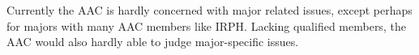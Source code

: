 Currently the AAC is hardly concerned with major related issues, except perhaps for majors with many AAC members like IRPH. Lacking qualified members, the AAC would also hardly able to judge major-specific issues. 
